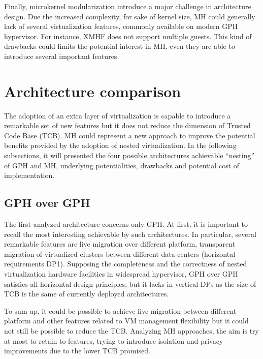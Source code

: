 \documentclass{acm_proc_article-sp} %
\begin{document}
Finally, microkernel modularization introduce a major challenge in architecture design. Due the increased complexity, for sake of kernel size, MH could generally lack of several virtualization features, commonly available on modern GPH hypervisor. For instance, XMHF does not support multiple guests. This kind of drawbacks could limits the potential interest in MH, even they are able to introduce several important features.


\section{Architecture comparison}

The adoption of an extra layer of virtualization is capable to introduce a remarkable set of new features but it does not reduce the dimension of Trusted Code Base (TCB). 
MH could represent a new approach to improve the potential benefits provided by the adoption of nested virtualization. In the following subsections, it will presented the four possible architectures achievable ``nesting'' of GPH and MH, underlying potentialities, drawbacks and potential cost of implementation.

\subsection{GPH over GPH}

The first analyzed architecture concerns only GPH. At first, it is important to recall the most interesting achievable by such architectures. In particular, several remarkable features are live migration over different platform, transparent migration of virtualized clusters between different data-centers (horizontal requirements DP1).
Supposing the completeness and the correctness of nested virtualization hardware facilities in widespread hypervisor, GPH over GPH satisfies all horizontal design principles, but it lacks in vertical DPs as the size of TCB is the same of currently deployed architectures.

To sum up, it could be possible to achieve live-migration between different platform and other features related to VM management flexibility but it could not still be possible to reduce the TCB. Analyzing MH approaches, the aim is try at most to retain to features, trying to introduce isolation and privacy improvements due to the lower TCB promised.

\end{document}
